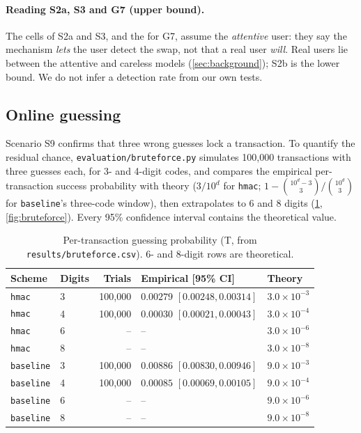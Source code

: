 \paragraph{Reading S2a, S3 and G7 (upper bound).}
The \cmark{} cells of S2a and S3, and the \cmark{} for G7, assume the
\emph{attentive} user: they say the mechanism \emph{lets} the user detect the
swap, not that a real user \emph{will}. Real users lie between the attentive and
careless models (\cref{sec:background}); S2b is the lower bound. We do not infer
a detection rate from our own tests.

\subsection{Online guessing}
Scenario S9 confirms that three wrong guesses lock a transaction. To quantify the
residual chance, \texttt{evaluation/bruteforce.py} simulates 100{,}000
transactions with three guesses each, for 3- and 4-digit codes, and compares the
empirical per-transaction success probability with theory
($3/10^d$ for \texttt{hmac}; $1-\binom{10^d-3}{3}/\binom{10^d}{3}$ for
\texttt{baseline}'s three-code window), then extrapolates to 6 and 8 digits
(\cref{tab:bruteforce}, \cref{fig:bruteforce}). Every 95\% confidence interval
contains the theoretical value.

\begin{table}[htbp]
\centering
\caption{Per-transaction guessing probability (T, from
\texttt{results/bruteforce.csv}). 6- and 8-digit rows are theoretical.}
\label{tab:bruteforce}
\small
\begin{tabular}{@{}llrll@{}}
\toprule
Scheme & Digits & Trials & Empirical [95\% CI] & Theory \\
\midrule
\texttt{hmac}     & 3 & 100{,}000 & $0.00279$ $[0.00248, 0.00314]$ & $3.0\times10^{-3}$ \\
\texttt{hmac}     & 4 & 100{,}000 & $0.00030$ $[0.00021, 0.00043]$ & $3.0\times10^{-4}$ \\
\texttt{hmac}     & 6 & --        & --                              & $3.0\times10^{-6}$ \\
\texttt{hmac}     & 8 & --        & --                              & $3.0\times10^{-8}$ \\
\texttt{baseline} & 3 & 100{,}000 & $0.00886$ $[0.00830, 0.00946]$ & $9.0\times10^{-3}$ \\
\texttt{baseline} & 4 & 100{,}000 & $0.00085$ $[0.00069, 0.00105]$ & $9.0\times10^{-4}$ \\
\texttt{baseline} & 6 & --        & --                              & $9.0\times10^{-6}$ \\
\texttt{baseline} & 8 & --        & --                              & $9.0\times10^{-8}$ \\
\bottomrule
\end{tabular}
\end{table}

